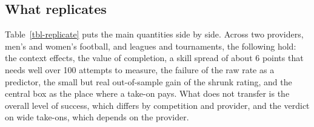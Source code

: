 \documentclass[
  12pt]{article}
\begin{document}
\subsection{What replicates}\label{sec-what-replicates}

Table~\ref{tbl-replicate} puts the main quantities side by side. Across
two providers, men's and women's football, and leagues and tournaments,
the following hold: the context effects, the value of completion, a
skill spread of about 6 points that needs well over 100 attempts to
measure, the failure of the raw rate as a predictor, the small but real
out-of-sample gain of the shrunk rating, and the central box as the
place where a take-on pays. What does not transfer is the overall level
of success, which differs by competition and provider, and the verdict
on wide take-ons, which depends on the provider.
\end{document}

